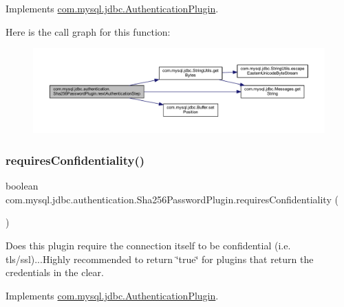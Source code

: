 Implements \mbox{\hyperlink{interfacecom_1_1mysql_1_1jdbc_1_1_authentication_plugin_a1ed9558616b029386dc24bcade409f3d}{com.\+mysql.\+jdbc.\+Authentication\+Plugin}}.

Here is the call graph for this function\+:
\nopagebreak
\begin{figure}[H]
\begin{center}
\leavevmode
\includegraphics[width=350pt]{classcom_1_1mysql_1_1jdbc_1_1authentication_1_1_sha256_password_plugin_aa46e906714a3b8a223f0e3e15e2aaf94_cgraph}
\end{center}
\end{figure}
\mbox{\label{classcom_1_1mysql_1_1jdbc_1_1authentication_1_1_sha256_password_plugin_a4ac61329eb620bd7e2432c5fcb3a40ef}} 
\subsubsection{\texorpdfstring{requires\+Confidentiality()}{requiresConfidentiality()}}
{\footnotesize\ttfamily boolean com.\+mysql.\+jdbc.\+authentication.\+Sha256\+Password\+Plugin.\+requires\+Confidentiality (\begin{DoxyParamCaption}{ }\end{DoxyParamCaption})}

Does this plugin require the connection itself to be confidential (i.\+e. tls/ssl)...Highly recommended to return \char`\"{}true\char`\"{} for plugins that return the credentials in the clear. 

Implements \mbox{\hyperlink{interfacecom_1_1mysql_1_1jdbc_1_1_authentication_plugin_a38b8ca6ee23b3b3e47de1549bb784a7d}{com.\+mysql.\+jdbc.\+Authentication\+Plugin}}.

